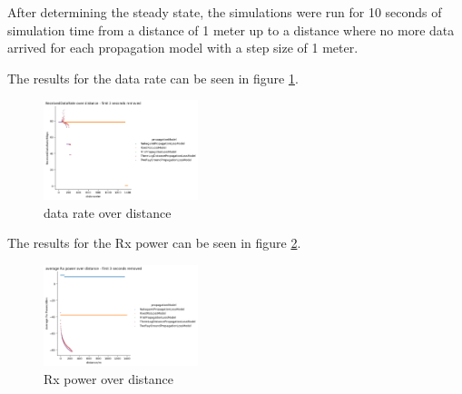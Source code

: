 After determining the steady state, the simulations were run for 10 seconds of simulation time from a distance of 1 meter 
up to a distance where no more data arrived for each propagation model with a step size of 1 meter.

The results for the data rate can be seen in figure \ref{fig:drOverDistance}.
\begin{figure}[ht]
    \centering
    \includegraphics[width=0.4\textwidth]{../DataAnalysis/results/data_rate_comp.png}
    \caption{data rate over distance}
    \label{fig:drOverDistance}
\end{figure}

The results for the Rx power can be seen in figure \ref{fig:rxPowerOverDistance}.   
\begin{figure}[ht]
    \centering
    \includegraphics[width=0.4\textwidth]{../DataAnalysis/results/rx_pwr_comp.png}
    \caption{Rx power over distance}
    \label{fig:rxPowerOverDistance}
\end{figure}